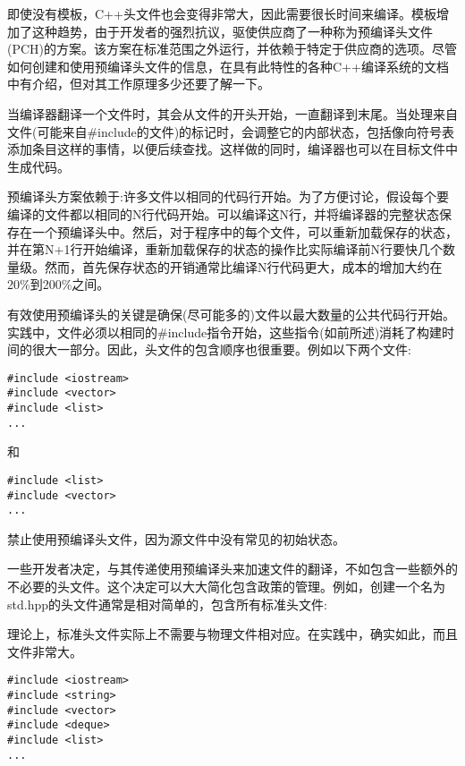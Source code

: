 
即使没有模板，C++头文件也会变得非常大，因此需要很长时间来编译。模板增加了这种趋势，由于开发者的强烈抗议，驱使供应商了一种称为预编译头文件(PCH)的方案。该方案在标准范围之外运行，并依赖于特定于供应商的选项。尽管如何创建和使用预编译头文件的信息，在具有此特性的各种C++编译系统的文档中有介绍，但对其工作原理多少还要了解一下。

当编译器翻译一个文件时，其会从文件的开头开始，一直翻译到末尾。当处理来自文件(可能来自\#include的文件)的标记时，会调整它的内部状态，包括像向符号表添加条目这样的事情，以便后续查找。这样做的同时，编译器也可以在目标文件中生成代码。

预编译头方案依赖于:许多文件以相同的代码行开始。为了方便讨论，假设每个要编译的文件都以相同的N行代码开始。可以编译这N行，并将编译器的完整状态保存在一个预编译头中。然后，对于程序中的每个文件，可以重新加载保存的状态，并在第N+1行开始编译，重新加载保存的状态的操作比实际编译前N行要快几个数量级。然而，首先保存状态的开销通常比编译N行代码更大，成本的增加大约在20\%到200\%之间。

有效使用预编译头的关键是确保(尽可能多的)文件以最大数量的公共代码行开始。实践中，文件必须以相同的\#include指令开始，这些指令(如前所述)消耗了构建时间的很大一部分。因此，头文件的包含顺序也很重要。例如以下两个文件:

\begin{lstlisting}[style=styleCXX]
#include <iostream>
#include <vector>
#include <list>
...
\end{lstlisting}

和

\begin{lstlisting}[style=styleCXX]
#include <list>
#include <vector>
...
\end{lstlisting}

禁止使用预编译头文件，因为源文件中没有常见的初始状态。

一些开发者决定，与其传递使用预编译头来加速文件的翻译，不如包含一些额外的不必要的头文件。这个决定可以大大简化包含政策的管理。例如，创建一个名为std.hpp的头文件通常是相对简单的，包含所有标准头文件:

\begin{tcolorbox}[colback=webgreen!5!white,colframe=webgreen!75!black]
\hspace*{0.75cm}理论上，标准头文件实际上不需要与物理文件相对应。在实践中，确实如此，而且文件非常大。
\end{tcolorbox}

\begin{lstlisting}[style=styleCXX]
#include <iostream>
#include <string>
#include <vector>
#include <deque>
#include <list>
...
\end{lstlisting}

